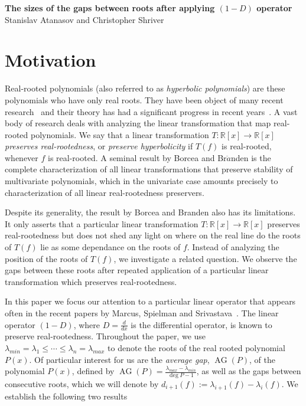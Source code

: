 \documentclass[11pt]{article}
\DeclareMathOperator{\AG}{AG}
\begin{document}
\begin{center}
\textbf{The sizes of the gaps between roots after applying $(1-D)$ operator}\\
Stanislav Atanasov and Christopher Shriver
\end{center}

\section{Motivation}
Real-rooted polynomials (also referred to as \emph{hyperbolic polynomials}) are these polynomials who have only real roots. They have been object of many recent research~\cite{Borcea1, Borcea2, Spielman, Fisk} and their theory has had a significant progress in recent years~\cite{Borcea1, Borcea2}. A vast body of research deals with analyzing the linear transformation that map real-rooted polynomials. We say that a linear transformation $T:\mathbb{R}[x]\to\mathbb{R}[x]$ \emph{preserves real-rootedness}, or \emph{preserve hyperbolicity} if $T(f)$ is real-rooted, whenever $f$ is real-rooted. A seminal result by Borcea and Br$\ddot{a}$nden is the complete characterization of all linear transformations that preserve stability of multivariate polynomials, which in the univariate case amounts precisely to characterization of all linear real-rootedness preservers.

Despite its generality, the result by Borcea and Branden also has its limitations. It only asserts that a particular linear transformation $T:\mathbb{R}[x]\to\mathbb{R}[x]$ preserves real-rootedness but does not shed any light on where on the real line do the roots of $T(f)$ lie as some dependance on the roots of $f$. Instead of analyzing the position of the roots of $T(f)$, we investigate a related question. We observe the gaps between these roots after repeated application of a particular linear transformation which preserves real-rootedness.

In this paper we focus our attention to a particular linear operator that appears often in the recent papers by Marcus, Spielman and Srivastava~\cite{Spielman}. The linear operator $(1-D)$, where $D=\frac{d}{dx}$ is the differential operator, is known to preserve real-rootedness. Throughout the paper, we use $\lambda_{min}=\lambda_1\leq \cdots \leq \lambda_n = \lambda_{max}$ to denote the roots of the real rooted polynomial $P(x)$. Of particular interest for us are the \emph{average gap}, $\AG(P)$, of the polynomial $P(x)$, defined by $\AG(P)=\frac{\lambda_{max} - \lambda_{min}}{\deg P - 1}$, as well as the gaps between consecutive roots, which we will denote by $d_{i+1}(f) := \lambda_{i+1}(f) - \lambda_i(f)$. We establish the following two results
\end{document}
